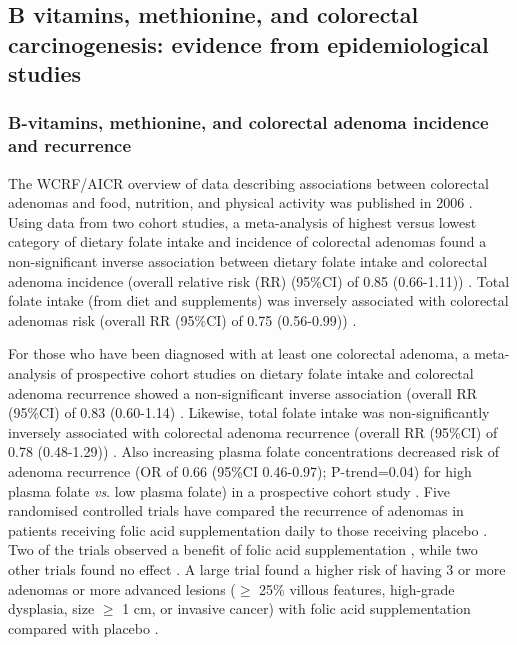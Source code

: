 \subsection{B vitamins, methionine, and colorectal carcinogenesis: evidence from epidemiological studies} %
 
\subsubsection{B-vitamins, methionine, and colorectal adenoma incidence and recurrence} %
\noindent The WCRF/AICR overview of data describing associations between colorectal adenomas and food, nutrition, and physical activity was published in 2006 \cite{c146}. Using data from two cohort studies, a meta-analysis of highest versus lowest category of dietary folate intake and incidence of colorectal adenomas found a non-significant inverse association between dietary folate intake and colorectal adenoma incidence (overall relative risk (RR) (95\%CI) of 0.85 (0.66-1.11)) \cite{c146}. Total folate intake (from diet and supplements) was inversely associated with colorectal adenomas risk (overall RR (95\%CI) of 0.75 (0.56-0.99)) \cite{c146}. 
 
\noindent For those who have been diagnosed with at least one colorectal adenoma, a meta-analysis of prospective cohort studies on dietary folate intake and colorectal adenoma recurrence showed a non-significant inverse association (overall RR (95\%CI) of 0.83 (0.60-1.14) \cite{c146}. Likewise, total folate intake was non-significantly inversely associated with colorectal adenoma recurrence (overall RR (95\%CI) of 0.78 (0.48-1.29)) \cite{c146}. Also increasing plasma folate concentrations decreased risk of adenoma recurrence (OR of 0.66 (95\%CI 0.46-0.97); P-trend=0.04) for high plasma folate \textit{vs}. low plasma folate) in a prospective cohort study \cite{c147}. Five randomised controlled trials have compared the recurrence of adenomas in patients receiving folic acid supplementation daily to those receiving placebo \cite{c148,c149,c150,c151,c152}. Two of the trials observed a benefit of folic acid supplementation \cite{c149,c151}, while two other trials found no effect \cite{c150,c152}. A large trial found a higher risk of having 3 or more adenomas or more advanced lesions ($\geq$ 25\% villous features, high-grade dysplasia, size $\geq$ 1 cm, or invasive cancer) with folic acid supplementation compared with placebo \cite{c148}. 
 
